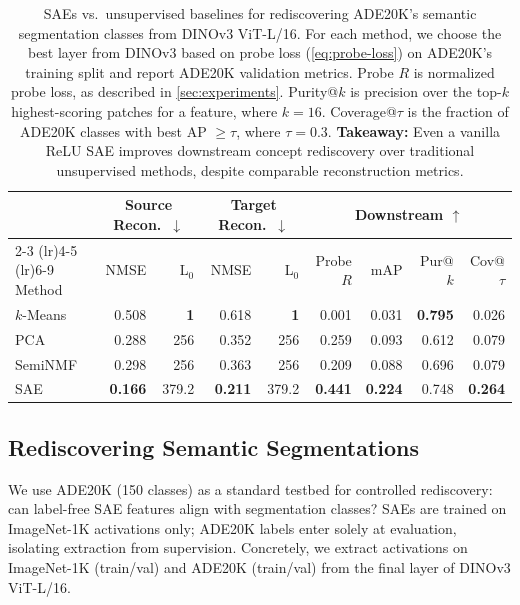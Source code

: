 \documentclass[runningheads]{llncs}
\begin{document}
\begin{table}[t]
    \centering
    \small
    \caption{SAEs vs.\ unsupervised baselines for rediscovering ADE20K's semantic segmentation classes from DINOv3 ViT-L/16.
    For each method, we choose the best layer from DINOv3 based on probe loss (\cref{eq:probe-loss}) on ADE20K's training split and report ADE20K validation metrics.
    Probe $R$ is normalized probe loss, as described in \cref{sec:experiments}.
    Purity@$k$ is precision over the top-$k$ highest-scoring patches for a feature, where $k=16$.
    Coverage@$\tau$ is the fraction of ADE20K classes with best AP $\geq\tau$, where $\tau= 0.3$.
    \textbf{Takeaway:} Even a vanilla ReLU SAE improves downstream concept rediscovery over traditional unsupervised methods, despite comparable reconstruction metrics.
    }\label{tab:ade20k}
    \setlength{\tabcolsep}{3pt}
    \begin{tabular}{l rr rr rrrr}
    \toprule
    & \multicolumn{2}{c}{Source Recon.\ $\downarrow$} & \multicolumn{2}{c}{Target Recon.\ $\downarrow$} & \multicolumn{4}{c}{Downstream $\uparrow$} \\
    \cmidrule(lr){2-3} \cmidrule(lr){4-5} \cmidrule(lr){6-9}
    Method & NMSE & L$_0$ & NMSE & L$_0$ & Probe $R$ & mAP & Pur@$k$ & Cov@$\tau$ \\
    \midrule
    $k$-Means & 0.508 & \textbf{1} & 0.618 & \textbf{1} & 0.001 & 0.031 & \textbf{0.795} & 0.026 \\  %
    PCA & 0.288 & 256 & 0.352 & 256 & 0.259 & 0.093 & 0.612 & 0.079 \\ %
    SemiNMF & 0.298 & 256 & 0.363 & 256 & 0.209 & 0.088 & 0.696 & 0.079 \\
    \midrule
    SAE & \textbf{0.166} & 379.2 & \textbf{0.211} & 379.2 & \textbf{0.441} & \textbf{0.224} & 0.748 & \textbf{0.264} \\  %
    \bottomrule
    \end{tabular}
\end{table}



\subsection{Rediscovering Semantic Segmentations}\label{sec:ade20k}

We use ADE20K (150 classes) as a standard testbed for controlled rediscovery: can label-free SAE features align with segmentation classes? 
SAEs are trained on ImageNet-1K activations only; ADE20K labels enter solely at evaluation, isolating extraction from supervision.
Concretely, we extract activations on ImageNet-1K (train/val) and ADE20K (train/val) from the final layer of DINOv3 ViT-L/16. 
\end{document}
